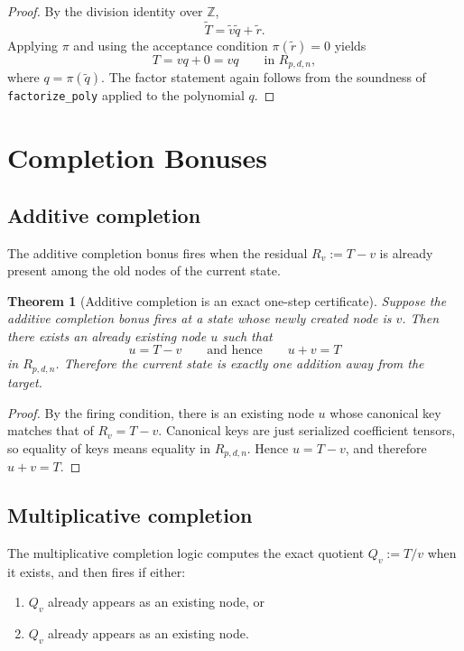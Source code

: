\documentclass[11pt]{article}
\newtheorem{theorem}{Theorem}
\theoremstyle{remark}
\newcommand{\Z}{\mathbb{Z}}
\begin{document}
\begin{proof}
By the division identity over $\Z$,
\[
\widetilde{T} = \widetilde{v}\widetilde{q} + \widetilde{r}.
\]
Applying $\pi$ and using the acceptance condition $\pi(\widetilde{r}) = 0$
yields
\[
T = v q + 0 = v q
\qquad \text{in } R_{p,d,n},
\]
where $q = \pi(\widetilde{q})$. The factor statement again follows from the
soundness of \texttt{factorize\_poly} applied to the polynomial $q$.
\end{proof}

\section{Completion Bonuses}

\subsection{Additive completion}

The additive completion bonus fires when the residual $R_v := T-v$ is already
present among the old nodes of the current state.

\begin{theorem}[Additive completion is an exact one-step certificate]
Suppose the additive completion bonus fires at a state whose newly created node
is $v$. Then there exists an already existing node $u$ such that
\[
u = T-v
\qquad \text{and hence} \qquad
u + v = T
\]
in $R_{p,d,n}$. Therefore the current state is exactly one addition away from
the target.
\end{theorem}

\begin{proof}
By the firing condition, there is an existing node $u$ whose canonical key
matches that of $R_v = T-v$. Canonical keys are just serialized coefficient
tensors, so equality of keys means equality in $R_{p,d,n}$. Hence $u = T-v$,
and therefore $u+v=T$.
\end{proof}

\subsection{Multiplicative completion}

The multiplicative completion logic computes the exact quotient $Q_v := T/v$
when it exists, and then fires if either:
\begin{enumerate}[leftmargin=2em]
\item $Q_v$ already appears as an existing node, or
\item $Q_v$ already appears as an existing node.
\end{enumerate}
\end{document}

